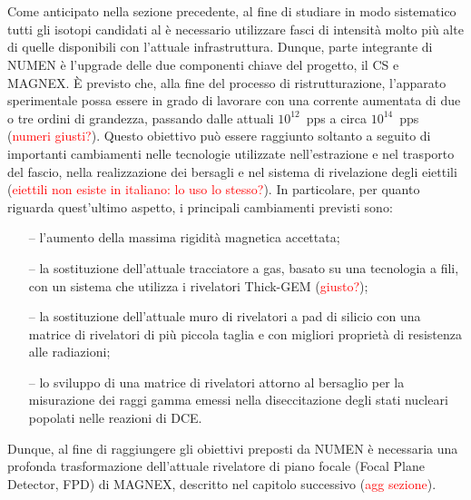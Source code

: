 
\section{}

Come anticipato nella sezione precedente, al fine di studiare in modo sistematico tutti gli isotopi candidati al \doppiobeta{} è necessario utilizzare fasci di intensità molto più alte di quelle disponibili con l'attuale infrastruttura. Dunque, parte integrante di NUMEN è l'upgrade delle due componenti chiave del progetto, il CS e MAGNEX. 
È previsto che, alla fine del processo di ristrutturazione, l'apparato sperimentale possa essere in grado di lavorare con una corrente aumentata di due o tre ordini di grandezza, passando dalle attuali $10^{12}$~pps a circa $10^{14}$~pps (\textcolor{red}{numeri giusti?}).
Questo obiettivo può essere raggiunto soltanto a seguito di importanti cambiamenti nelle tecnologie utilizzate nell'estrazione e nel trasporto del fascio, nella realizzazione dei bersagli e nel sistema di rivelazione degli eiettili (\textcolor{red}{eiettili non esiste in italiano: lo uso lo stesso?}). 
In particolare, per quanto riguarda quest'ultimo aspetto, i principali cambiamenti previsti sono:
\begin{itemize}
	\item[--] l'aumento della massima rigidità magnetica accettata;
	\item[--] la sostituzione dell'attuale tracciatore a gas, basato su una tecnologia a fili, con un sistema che utilizza i rivelatori Thick-GEM (\textcolor{red}{giusto?});
	\item[--] la sostituzione dell'attuale muro di rivelatori a pad di silicio con una matrice di rivelatori di più piccola taglia e con migliori proprietà di resistenza alle radiazioni;
	\item[--] lo sviluppo di una matrice di rivelatori attorno al bersaglio per la misurazione dei raggi gamma emessi nella diseccitazione degli stati nucleari popolati nelle reazioni di DCE.
\end{itemize}
Dunque, al fine di raggiungere gli obiettivi preposti da NUMEN è necessaria una profonda trasformazione dell'attuale rivelatore di piano focale (Focal Plane Detector, FPD) di MAGNEX, descritto nel capitolo successivo (\textcolor{red}{agg sezione}).


